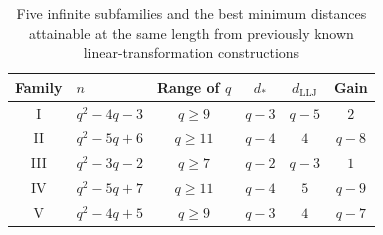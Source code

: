 \documentclass[preprint,12pt,a4paper]{elsarticle}
\begin{document}
\begin{table}[htbp]
\centering\small
\caption{Five infinite subfamilies and the best minimum distances attainable at the same length from previously known linear-transformation constructions}
\label{tab:infinite-comparison}
\setlength{\tabcolsep}{4pt}
\begin{tabular}{clcccc}
\toprule
Family&$n$&Range of $q$&$d_*$&$d_{\mathrm{LLJ}}$&Gain\\
\midrule
I&$q^2-4q-3$&$q\ge9$&$q-3$&$q-5$&$2$\\
II&$q^2-5q+6$&$q\ge11$&$q-4$&$4$&$q-8$\\
III&$q^2-3q-2$&$q\ge7$&$q-2$&$q-3$&$1$\\
IV&$q^2-5q+7$&$q\ge11$&$q-4$&$5$&$q-9$\\
V&$q^2-4q+5$&$q\ge9$&$q-3$&$4$&$q-7$\\
\bottomrule
\end{tabular}
\end{table}
\end{document}
